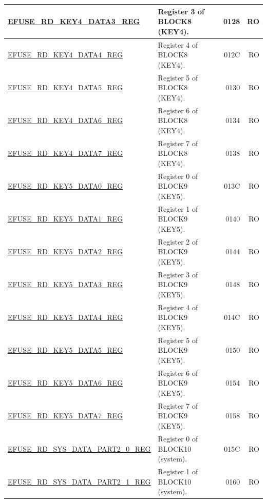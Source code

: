 \begin{longtable}{ | m{6cm} | m{7.2cm} | r| r | }
\hyperref[regdesc:EFUSERDKEY4DATANREG]{EFUSE\_RD\_KEY4\_DATA3\_REG} & Register 3 of BLOCK8 (KEY4). & \hexprefix{}0128 & RO \\ \hline
\hyperref[regdesc:EFUSERDKEY4DATANREG]{EFUSE\_RD\_KEY4\_DATA4\_REG} & Register 4 of BLOCK8 (KEY4). & \hexprefix{}012C & RO \\ \hline
\hyperref[regdesc:EFUSERDKEY4DATANREG]{EFUSE\_RD\_KEY4\_DATA5\_REG} & Register 5 of BLOCK8 (KEY4). & \hexprefix{}0130 & RO \\ \hline
\hyperref[regdesc:EFUSERDKEY4DATANREG]{EFUSE\_RD\_KEY4\_DATA6\_REG} & Register 6 of BLOCK8 (KEY4). & \hexprefix{}0134 & RO \\ \hline
\hyperref[regdesc:EFUSERDKEY4DATANREG]{EFUSE\_RD\_KEY4\_DATA7\_REG} & Register 7 of BLOCK8 (KEY4). & \hexprefix{}0138 & RO \\ \hline
\hyperref[regdesc:EFUSERDKEY5DATANREG]{EFUSE\_RD\_KEY5\_DATA0\_REG} & Register 0 of BLOCK9 (KEY5). & \hexprefix{}013C & RO \\ \hline
\hyperref[regdesc:EFUSERDKEY5DATANREG]{EFUSE\_RD\_KEY5\_DATA1\_REG} & Register 1 of BLOCK9 (KEY5). & \hexprefix{}0140 & RO \\ \hline
\hyperref[regdesc:EFUSERDKEY5DATANREG]{EFUSE\_RD\_KEY5\_DATA2\_REG} & Register 2 of BLOCK9 (KEY5). & \hexprefix{}0144 & RO \\ \hline
\hyperref[regdesc:EFUSERDKEY5DATANREG]{EFUSE\_RD\_KEY5\_DATA3\_REG} & Register 3 of BLOCK9 (KEY5). & \hexprefix{}0148 & RO \\ \hline
\hyperref[regdesc:EFUSERDKEY5DATANREG]{EFUSE\_RD\_KEY5\_DATA4\_REG} & Register 4 of BLOCK9 (KEY5). & \hexprefix{}014C & RO \\ \hline
\hyperref[regdesc:EFUSERDKEY5DATANREG]{EFUSE\_RD\_KEY5\_DATA5\_REG} & Register 5 of BLOCK9 (KEY5). & \hexprefix{}0150 & RO \\ \hline
\hyperref[regdesc:EFUSERDKEY5DATANREG]{EFUSE\_RD\_KEY5\_DATA6\_REG} & Register 6 of BLOCK9 (KEY5). & \hexprefix{}0154 & RO \\ \hline
\hyperref[regdesc:EFUSERDKEY5DATANREG]{EFUSE\_RD\_KEY5\_DATA7\_REG} & Register 7 of BLOCK9 (KEY5). & \hexprefix{}0158 & RO \\ \hline
\hyperref[regdesc:EFUSERDSYSDATAPART2NREG]{EFUSE\_RD\_SYS\_DATA\_PART2\_0\_REG} & Register 0 of BLOCK10 (system). & \hexprefix{}015C & RO \\ \hline
\hyperref[regdesc:EFUSERDSYSDATAPART2NREG]{EFUSE\_RD\_SYS\_DATA\_PART2\_1\_REG} & Register 1 of BLOCK10 (system). & \hexprefix{}0160 & RO \\ \hline

\end{longtable}
